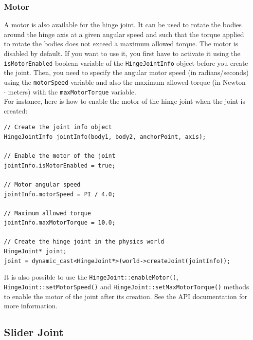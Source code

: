 \documentclass[a4paper,12pt]{article}
\begin{document}
     \subsubsection{Motor}

     A motor is also available for the hinge joint. It can be used to rotate the bodies around the hinge axis at a given angular speed and such that the torque applied to
     rotate the bodies does not exceed a maximum allowed torque. The motor is disabled by default. If you want to use it, you first have to activate it using the
     \texttt{isMotorEnabled} boolean variable of the \texttt{HingeJointInfo} object before you create the joint. Then, you need to specify the angular motor speed (in radians/seconds)
     using the \texttt{motorSpeed} variable and also the maximum allowed torque (in Newton $\cdot$ meters) with the \texttt{maxMotorTorque} variable. \\

     For instance, here is how to enable the motor of the hinge joint when the joint is created: \\

     \begin{lstlisting}
// Create the joint info object
HingeJointInfo jointInfo(body1, body2, anchorPoint, axis);

// Enable the motor of the joint
jointInfo.isMotorEnabled = true;

// Motor angular speed
jointInfo.motorSpeed = PI / 4.0;

// Maximum allowed torque
jointInfo.maxMotorTorque = 10.0;

// Create the hinge joint in the physics world
HingeJoint* joint;
joint = dynamic_cast<HingeJoint*>(world->createJoint(jointInfo));
  \end{lstlisting}

     \vspace{0.6cm}

     \begin{sloppypar}
        It is also possible to use the \texttt{HingeJoint::enableMotor()}, \texttt{HingeJoint::setMotorSpeed()} and
	     \texttt{HingeJoint::setMaxMotorTorque()} methods to
        enable the motor of the joint after its creation. See the API documentation for more information.
     \end{sloppypar}

    \subsection{Slider Joint}
\end{document}
